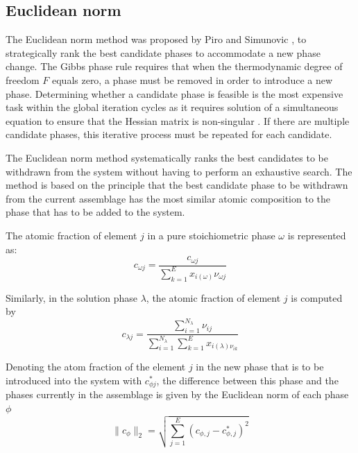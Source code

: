 	\subsection{Euclidean norm} \label{sec:Euclidean}
	The Euclidean norm method was proposed by Piro and Simunovic \cite{Piro12a}, to strategically rank the best candidate phases to accommodate a new phase change. The Gibbs phase rule requires that when the thermodynamic degree of freedom $F$ equals zero, a phase must be removed in order to introduce a new phase. Determining whether a candidate phase is feasible is the most expensive task within the global iteration cycles as it requires solution of a simultaneous equation to ensure that the Hessian matrix is non-singular \cite{Piro12a}. If there are multiple candidate phases, this iterative process must be repeated for each candidate.

	The Euclidean norm method systematically ranks the best candidates to be withdrawn from the system without having to perform an exhaustive search. The method is based on the principle that the best candidate phase to be withdrawn from the current assemblage has the most similar atomic composition to the phase that has to be added to the system.

	The atomic fraction of element $j$ in a pure stoichiometric phase $\omega$ is represented as:
	\begin{equation}
		c_{\omega j} = \frac{c_{\omega j}}{\sum_{k=1}^{E} x_{i(\omega)}\nu_{\omega j}}
	\end{equation}

	Similarly, in the solution phase  $\lambda$, the atomic fraction of element $j$ is computed by
	\begin{equation}
		c_{\lambda j} = \frac{\sum_{i=1}^{N_{\lambda}} \nu_{ij}}{\sum_{i=1}^{N_{\lambda}} \sum_{k=1}^{E} x_{i(\lambda) \nu_{ik}}}
	\end{equation}

	Denoting the atom fraction of the element $j$ in the new phase that is to be introduced into the system with $c_{\phi j}^{*}$, the difference between this phase and the phases currently in the assemblage is given by the Euclidean norm of each phase $\phi$
	\begin{equation}
		\|c_\phi\|_2 = \sqrt{\sum_{j=1}^{E} \left(c_{\phi,j} - c_{\phi,j}^{*}\right)^2}
	\end{equation}

